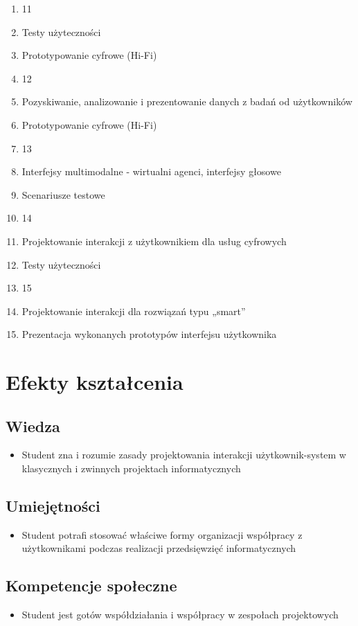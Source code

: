 \documentclass[12pt, a4paper]{article}
\begin{document}
\begin{enumerate}
  \item 11
  \item Testy użyteczności
  \item Prototypowanie cyfrowe (Hi-Fi)
  \item 12
  \item Pozyskiwanie, analizowanie i prezentowanie  danych z badań od użytkowników
  \item Prototypowanie cyfrowe (Hi-Fi)
  \item 13
  \item Interfejsy multimodalne - wirtualni agenci, interfejsy głosowe
  \item Scenariusze testowe
  \item 14
  \item Projektowanie interakcji z użytkownikiem dla usług cyfrowych
  \item Testy użyteczności
  \item 15
  \item Projektowanie interakcji dla rozwiązań typu „smart”
  \item Prezentacja wykonanych prototypów interfejsu użytkownika
\end{enumerate}

\section{Efekty kształcenia}

\subsection*{Wiedza}
\begin{itemize}
  \item Student zna i rozumie zasady projektowania interakcji użytkownik-system w klasycznych i zwinnych projektach informatycznych
\end{itemize}

\subsection*{Umiejętności}
\begin{itemize}
  \item Student potrafi stosować właściwe formy organizacji współpracy z użytkownikami podczas realizacji przedsięwzięć informatycznych
\end{itemize}

\subsection*{Kompetencje społeczne}
\begin{itemize}
  \item Student jest gotów współdziałania i współpracy w zespołach projektowych
\end{itemize}
\end{document}
